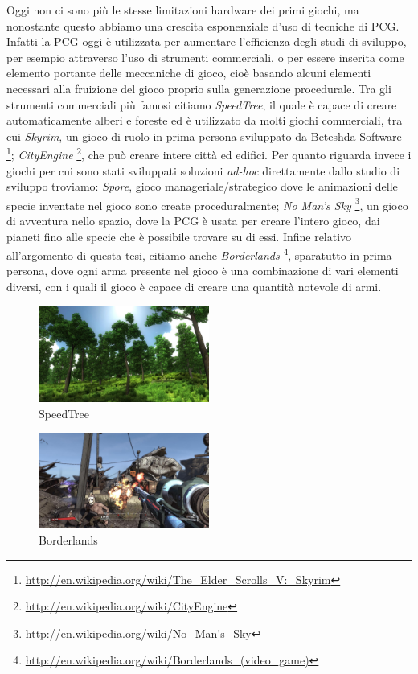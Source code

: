 \documentclass[12pt, italian]{toptesi}
\begin{document}
Oggi non ci sono più le stesse limitazioni hardware dei primi giochi, ma nonostante questo abbiamo una crescita esponenziale d'uso di tecniche di PCG.
Infatti la PCG oggi è utilizzata per aumentare l'efficienza degli studi di sviluppo, per esempio attraverso l'uso di strumenti commerciali, o per essere inserita come elemento portante delle meccaniche di gioco, cioè basando alcuni elementi necessari alla fruizione del gioco proprio sulla generazione procedurale.
Tra gli strumenti commerciali più famosi citiamo \emph{SpeedTree}, il quale è capace di creare automaticamente alberi e foreste ed è utilizzato da molti giochi commerciali, tra cui \emph{Skyrim}, un gioco di ruolo in prima persona sviluppato da Beteshda Software \footnote{\url{http://en.wikipedia.org/wiki/The_Elder_Scrolls_V:_Skyrim}}; \emph{CityEngine} \footnote{\url{http://en.wikipedia.org/wiki/CityEngine}}, che può creare intere città ed edifici.
Per quanto riguarda invece i giochi per cui sono stati sviluppati soluzioni \emph{ad-hoc} direttamente dallo studio di sviluppo troviamo: \emph{Spore}, gioco manageriale/strategico dove le animazioni delle specie inventate nel gioco sono create proceduralmente; \emph{No Man's Sky} \footnote{\url{http://en.wikipedia.org/wiki/No_Man's_Sky}}, un gioco di avventura nello spazio, dove la PCG è usata per creare l'intero gioco, dai pianeti fino alle specie che è possibile trovare su di essi.
Infine relativo all'argomento di questa tesi, citiamo anche \emph{Borderlands} \footnote{\url{http://en.wikipedia.org/wiki/Borderlands_(video_game)}},
sparatutto in prima persona, dove ogni arma presente nel gioco è una combinazione di vari elementi diversi, con i quali il gioco è capace di creare una quantità notevole di armi.

\begin{figure}

\centering
\includegraphics[width=0.5\textwidth]{speedtree}
\caption{SpeedTree}
\label{fig:speedtree}

\end{figure}

\begin{figure}

\centering
\includegraphics[width=0.5\textwidth]{borderlands}
\caption{Borderlands}
\label{fig:borderlands}

\end{figure}
\end{document}
